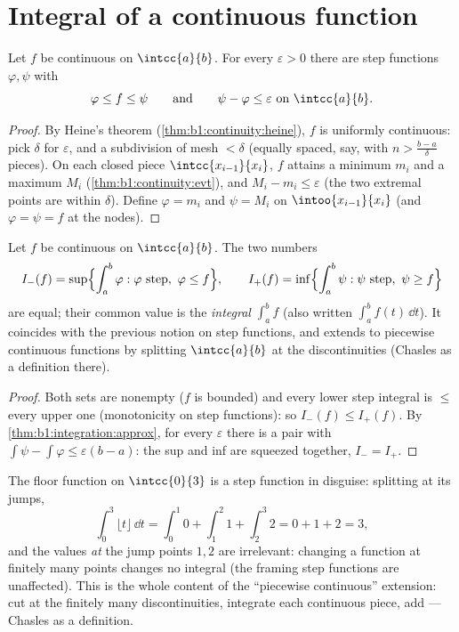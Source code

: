 \section{Integral of a continuous function}

\begin{theorem}\label{thm:b1:integration:approx}
Let $f$ be continuous on $\intcc{a}{b}$. For every $\varepsilon > 0$
there are step functions $\varphi, \psi$ with
\[
\varphi \leq f \leq \psi
\qquad\text{and}\qquad
\psi - \varphi \leq \varepsilon \text{ on } \intcc{a}{b}.
\]
\end{theorem}

\begin{proof}
By Heine's theorem (\cref{thm:b1:continuity:heine}), $f$ is uniformly
continuous: pick $\delta$ for $\varepsilon$, and a subdivision of
mesh $< \delta$ (equally spaced, say, with $n > \frac{b -
a}{\delta}$ pieces). On each closed piece $\intcc{x_{i-1}}{x_i}$, $f$
attains a minimum $m_i$ and a maximum $M_i$
(\cref{thm:b1:continuity:evt}), and $M_i - m_i \leq \varepsilon$
(the two extremal points are within $\delta$). Define $\varphi = m_i$
and $\psi = M_i$ on $\intoo{x_{i-1}}{x_i}$ (and $\varphi = \psi = f$
at the nodes).
\end{proof}

\begin{theorem}\label{thm:b1:integration:def}
Let $f$ be continuous on $\intcc{a}{b}$. The two numbers
\[
I_-(f) = \sup\Bigl\{\int_a^b \varphi : \varphi \text{ step},\
\varphi \leq f\Bigr\},
\qquad
I_+(f) = \inf\Bigl\{\int_a^b \psi : \psi \text{ step},\ \psi \geq
f\Bigr\}
\]
are equal; their common value is the
\emph{integral} $\int_a^b f$ (also written $\int_a^b
f(t)\,\dd t$). It coincides with the previous notion on step
functions, and extends to piecewise continuous functions by
splitting $\intcc{a}{b}$ at the discontinuities (Chasles as a
definition there).
\end{theorem}

\begin{proof}
Both sets are nonempty ($f$ is bounded) and every lower step integral
is $\leq$ every upper one (monotonicity on step functions): so
$I_-(f) \leq I_+(f)$. By \cref{thm:b1:integration:approx}, for every
$\varepsilon$ there is a pair with $\int\psi - \int\varphi \leq
\varepsilon(b - a)$: the sup and inf are squeezed together, $I_- =
I_+$.
\end{proof}

\begin{example}\label{ex:b1:integration:piecewise}
The floor function on $\intcc{0}{3}$ is a step function in
disguise: splitting at its jumps,
\[
\int_0^3 \lfloor t \rfloor\,\dd t
= \int_0^1 0 + \int_1^2 1 + \int_2^3 2 = 0 + 1 + 2 = 3 ,
\]
and the values \emph{at} the jump points $1, 2$ are irrelevant:
changing a function at finitely many points changes no integral
(the framing step functions are unaffected). This is the whole
content of the ``piecewise continuous'' extension: cut at the
finitely many discontinuities, integrate each continuous piece,
add --- Chasles as a definition.
\end{example}

